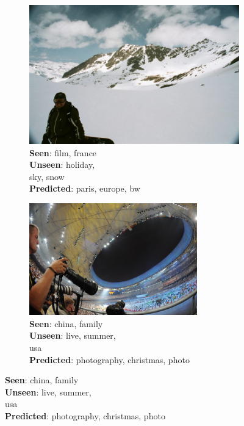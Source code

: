 \begin{figure}
        \centering
	\captionsetup{justification=raggedright,
	singlelinecheck=false
	}
        \begin{subfigure}[b]{0.16\textwidth}
                \includegraphics[width=\textwidth]{TagTree/Flickrimg/7a6b7ae7-7afb-3f90-92df-e67c0bd22a8a.jpeg}
                \caption{\textbf{Seen}: film, france \\ \textbf{Unseen}: holiday, \\ sky, snow \\ \textbf{Predicted}: paris, europe, bw }
                \label{fig:negex1}
        \end{subfigure}%
	\; \vline
        \; %
        \begin{subfigure}[b]{0.17\textwidth}
                \includegraphics[width=0.8\textwidth]{TagTree/Flickrimg/ec4436dd-57b3-36af-94f6-64cf05294886.jpeg}
                \caption{\textbf{Seen}: china, family \\ \textbf{Unseen}: live, summer, \\ usa  \\ \textbf{Predicted}: photography, christmas, photo }

\end{subfigure}
\end{figure}
